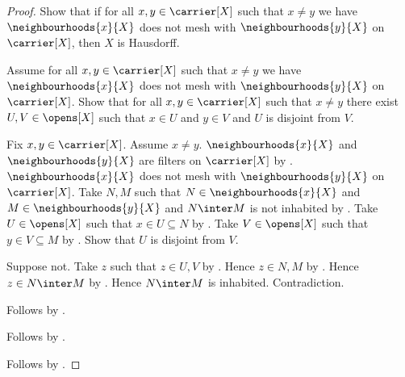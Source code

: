 \begin{proof}
    Show that if for all $x,y\in\carrier[X]$ such that $x\neq y$ we have
        $\neighbourhoods{x}{X}$ does not mesh with
        $\neighbourhoods{y}{X}$ on $\carrier[X]$, then
        $X$ is Hausdorff.
    \begin{subproof}
        Assume for all $x,y\in\carrier[X]$ such that $x\neq y$ we have
            $\neighbourhoods{x}{X}$ does not mesh with
            $\neighbourhoods{y}{X}$ on $\carrier[X]$.
        Show that for all $x,y\in\carrier[X]$ such that $x\neq y$ there
            exist $U,V\in\opens[X]$ such that $x\in U$ and $y\in V$ and
            $U$ is disjoint from $V$.
        \begin{subproof}
            Fix $x,y\in\carrier[X]$.
            Assume $x\neq y$.
            $\neighbourhoods{x}{X}$ and $\neighbourhoods{y}{X}$ are
                filters on $\carrier[X]$ by
                .
            $\neighbourhoods{x}{X}$ does not mesh with
                $\neighbourhoods{y}{X}$ on $\carrier[X]$.
            Take $N,M$ such that $N\in\neighbourhoods{x}{X}$ and
                $M\in\neighbourhoods{y}{X}$ and
                $N\inter M$ is not inhabited by .
            Take $U\in\opens[X]$ such that $x\in U\subseteq N$ by
                .
            Take $V\in\opens[X]$ such that $y\in V\subseteq M$ by
                .
            Show that $U$ is disjoint from $V$.
            \begin{subproof}
                Suppose not.
                Take $z$ such that $z\in U,V$ by .
                Hence $z\in N,M$ by .
                Hence $z\in N\inter M$ by .
                Hence $N\inter M$ is inhabited.
                Contradiction.
            \end{subproof}
            Follows by \auto.
        \end{subproof}
        Follows by .
    \end{subproof}
    Follows by \auto.
\end{proof}

